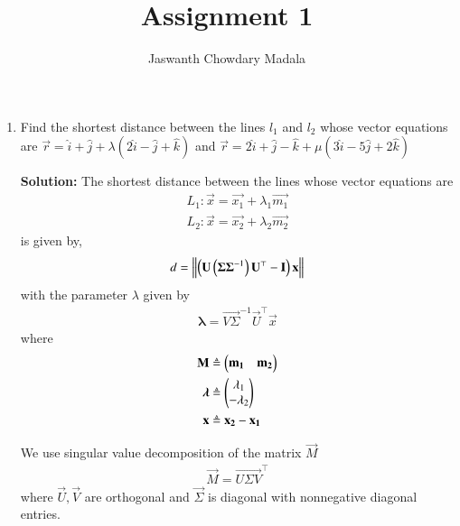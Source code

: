 \documentclass[journal,12pt,twocolumn]{IEEEtran}
\begin{document}
\vspace{3cm}


\title{Assignment 1}
\author{Jaswanth Chowdary Madala}





\maketitle

\newpage


\bigskip

\renewcommand{\thefigure}{\theenumi}
\renewcommand{\thetable}{\theenumi}

\begin{enumerate}
\item Find the shortest distance between the lines $l_1$ and $l_2$ whose vector equations are ${\overrightarrow{r} = \hat{i}+\hat{j}+\lambda(2\hat{i}-\hat{j}+\hat{k})}$ and ${\overrightarrow{r} = 2\hat{i}+\hat{j}-\hat{k}+\mu(3\hat{i}-5\hat{j}+2\hat{k})}$

\textbf{Solution:} 
The shortest distance between the lines whose vector equations are
\begin{align}
L_1: \vec{x} = \vec{x_1} + \lambda_1\vec{m_1} \label{eq:1} \\
L_2: \vec{x} = \vec{x_2} + \lambda_2\vec{m_2} \label{eq:2}
\end{align}
is given by,
\begin{align}
d = \left\lVert\left(\mathbf{U}\left(\mathbf{\Sigma\Sigma}^{-1}\right)\mathbf{U}^\top-\mathbf{I}\right)\mathbf{x}\right\rVert
\end{align}
with the parameter $\lambda$ given by
\begin{align}
\bm{\lambda} = \vec{V\Sigma}^{-1}\vec{U}^\top\vec{x} \label{eq:lambda-sol}
\end{align}
where
\begin{align}
\mathbf{M} &\triangleq \begin{pmatrix}\mathbf{m_1} & \mathbf{m_2}\end{pmatrix} \label{eq:3}\\
\bm{\lambda} &\triangleq \begin{pmatrix}\lambda_1\\-\lambda_2\end{pmatrix}\label{eq:4} \\
\mathbf{x} &\triangleq \mathbf{x_2} - \mathbf{x_1} \label{eq:5}
\end{align}

We use singular value decomposition of the matrix $\vec{M}$
\begin{align}
\vec{M} = \vec{U\Sigma V}^\top \label{eq:6}
\end{align}
where $\vec{U}, \vec{V}$ are orthogonal and $\vec{\Sigma}$ is diagonal with nonnegative diagonal entries.


\end{enumerate}
\end{document}
